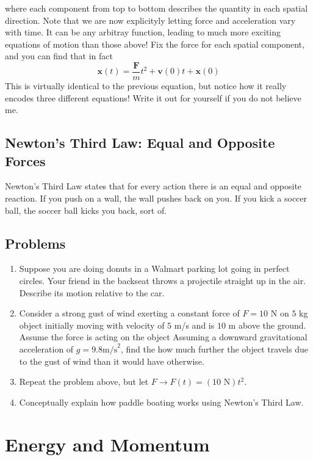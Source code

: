 \documentclass[titlepage]{article}
\begin{document}
where each component from top to bottom describes the quantity in each spatial direction. Note that we are now explicityly letting force and acceleration vary with time. It can be any arbitray function, leading to much more exciting equations of motion than those above!
Fix the force for each spatial component, and you can find that in fact
\begin{equation}
    \mathbf{x}(t) = \frac{\mathbf{F}}{m} t^2 + \mathbf{v}(0)t + \mathbf{x}(0)
\end{equation}
This is virtually identical to the previous equation, but notice how it really encodes three different equations! Write it out for yourself if you do not believe me.

\subsection{Newton's Third Law: Equal and Opposite Forces}

Newton's Third Law states that for every action there is an equal and opposite reaction. If you push on a wall, the wall pushes back on you. If you kick a soccer ball, the soccer ball kicks you back, sort of. 

\subsection{Problems}
\begin{enumerate}
    \item Suppose you are doing donuts in a Walmart parking lot going in perfect circles. Your friend in the backseat throws a projectile straight up in the air. Describe its motion relative to the car.
    \item Consider a strong gust of wind exerting a constant force of $F = 10$ N on $5$ kg object initially moving with velocity of $5$ m/s and is $10$ m above the ground. Assume the force is acting on the object   Assuming a downward gravitational acceleration of $g = 9.8 \textrm{m/s}^2$, find the how much further the object travels due to the gust of wind than it would have otherwise. \\
    \item Repeat the problem above, but let $F \rightarrow F(t) = (10 \textrm{ N})t^2. $
    \item Conceptually explain how paddle boating works using Newton's Third Law.
\end{enumerate}


\section{Energy and Momentum}
\end{document}
